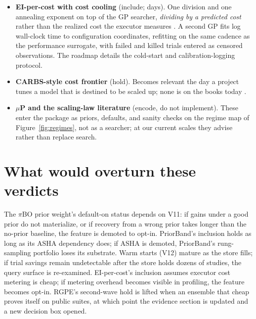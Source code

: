 \begin{decisions}
\begin{itemize}[leftmargin=1.3em, itemsep=2pt]
nothing ourselves; OptFormer-scale training runs are a research
program, not a package feature.
\item \textbf{EI-per-cost with cost cooling} (include; days). One
division and one annealing exponent on top of the GP searcher,
\emph{dividing by a predicted cost} rather than the realized cost the
executor measures \citep{lee2020carbo}. A second GP fits log
wall-clock time to configuration coordinates, refitting on the same
cadence as the performance surrogate, with failed and killed trials
entered as censored observations. The roadmap details the cold-start
and calibration-logging protocol.
\item \textbf{CARBS-style cost frontier} (hold). Becomes relevant the
day a project tunes a model that is destined to be scaled up; none is
on the books today \citep{fetterman2023carbs}.
\item \textbf{$\mu$P and the scaling-law literature} (encode, do not
implement). These enter the package as priors, defaults, and sanity
checks on the regime map of Figure~\ref{fig:regimes}, not as a
searcher; at our current scales they advise rather than replace
search.
\end{itemize}
\end{decisions}

\section{What would overturn these verdicts}

The $\pi$BO prior weight's default-on status depends on V11: if
gains under a good prior do not materialize, or if recovery from a
wrong prior takes longer than the no-prior baseline, the feature is
demoted to opt-in. PriorBand's inclusion holds as long as its ASHA
dependency does; if ASHA is demoted, PriorBand's rung-sampling
portfolio loses its substrate. Warm starts (V12) mature as the store
fills; if trial savings remain undetectable after the store holds
dozens of studies, the query surface is re-examined. EI-per-cost's
inclusion assumes executor cost metering is cheap; if metering
overhead becomes visible in profiling, the feature becomes opt-in.
RGPE's second-wave hold is lifted when an ensemble that cheap proves
itself on public suites, at which point the evidence section is
updated and a new decision box opened.
